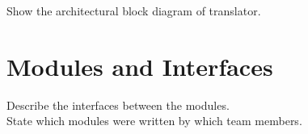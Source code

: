 Show the architectural block diagram of translator.\\

\section{Modules and Interfaces}
Describe the interfaces between the modules.\\

State which modules were written by which team members.
